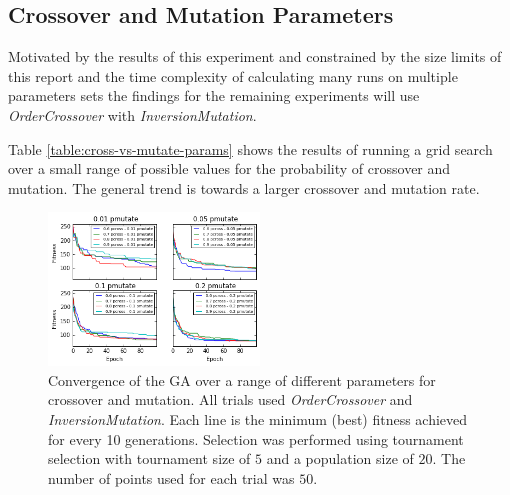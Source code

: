 \documentclass[journal]{IEEEtran}
\begin{document}
\subsection{Crossover and Mutation Parameters}
\label{subsec:crossover-mutation-parameters}
Motivated by the results of this experiment and constrained by the size limits of this report and the time complexity of calculating many runs on multiple parameters sets the findings for the remaining experiments will use \textit{OrderCrossover} with \textit{InversionMutation}.

Table \ref{table:cross-vs-mutate-params} shows the results of running a grid search over a small range of possible values for the probability of crossover and mutation. The general trend is towards a larger crossover and mutation rate.

\begin{table}[t]
\centering

\caption{Median fitness of running each of the different parameter values for population size and tournament size with \textit{TournamentSelection}. For all tests \textit{OrderCrossover} and \textit{InversionMutation} are used. All runs used a $0.9$ crossover rate and a $0.2$ mutation rate based on the results in section \ref{subsec:crossover-mutation-parameters}. Each was run for a total of $1000$ generations.}
\label{table:selection-vs-pop-size}
\end{table}

\begin{figure}[H]
\centering
\includegraphics[width=0.5\textwidth]{figures/cross_vs_mutate_params_convergence.png}
\caption{Convergence of the GA over a range of different parameters for crossover and mutation. All trials used \textit{OrderCrossover} and \textit{InversionMutation}. Each line is the minimum (best) fitness achieved for every 10 generations. Selection was performed using tournament selection with tournament size of $5$ and a population size of $20$. The number of points used for each trial was $50$.}
\label{fig:cross-vs-mutate-params}
\end{figure}
\end{document}
